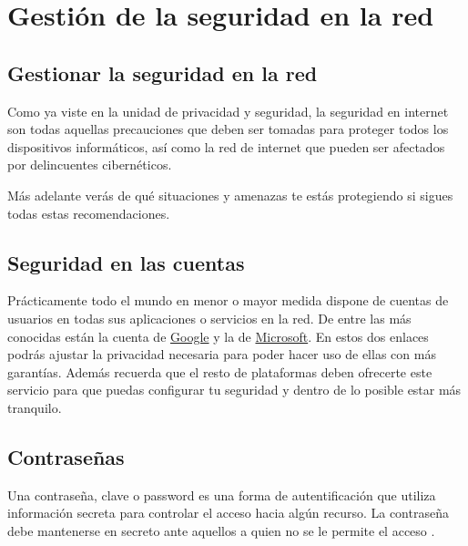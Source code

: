 \documentclass[
  spanish,
  a4paper,
  openany]{book}
\begin{document}
\hypertarget{gestiuxf3n-de-la-seguridad-en-la-red}{%
\chapter{Gestión de la seguridad en la red}\label{gestiuxf3n-de-la-seguridad-en-la-red}}

\hypertarget{gestionar-la-seguridad-en-la-red}{%
\section{Gestionar la seguridad en la red}\label{gestionar-la-seguridad-en-la-red}}

Como ya viste en la unidad de privacidad y seguridad, la seguridad en internet son todas aquellas precauciones que deben ser tomadas para proteger todos los dispositivos informáticos, así como la red de internet que pueden ser afectados por delincuentes cibernéticos.

Más adelante verás de qué situaciones y amenazas te estás protegiendo si sigues todas estas recomendaciones.

\hypertarget{seguridad-en-las-cuentas}{%
\section{Seguridad en las cuentas}\label{seguridad-en-las-cuentas}}

Prácticamente todo el mundo en menor o mayor medida dispone de cuentas de usuarios en todas sus aplicaciones o servicios en la red. De entre las más conocidas están la cuenta de \href{https://myaccount.google.com/security}{Google} y la de \href{https://account.microsoft.com/security}{Microsoft}. En estos dos enlaces podrás ajustar la privacidad necesaria para poder hacer uso de ellas con más garantías. Además recuerda que el resto de plataformas deben ofrecerte este servicio para que puedas configurar tu seguridad y dentro de lo posible estar más tranquilo.

\hypertarget{contraseuxf1as}{%
\section{Contraseñas}\label{contraseuxf1as}}

Una contraseña, clave o password es una forma de autentificación que utiliza información secreta para controlar el acceso hacia algún recurso. La contraseña debe mantenerse en secreto ante aquellos a quien no se le permite el acceso \citep{WIKI-password}.
\end{document}
